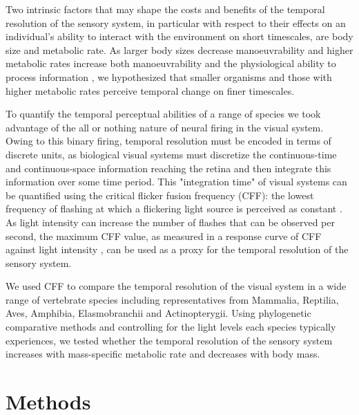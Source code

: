Two intrinsic factors that may shape the costs and benefits of the temporal resolution of the sensory system, in particular with respect to their effects on an individual's ability to interact with the environment on short timescales, are body size and metabolic rate. As larger body sizes decrease manoeuvrability \citep{heglund1988speed,dudley2002mechanisms,biewener2003animal,sato2007stroke,vogel2008modes,hedrick2011damping,watanabe2012slowest} and higher metabolic rates increase both manoeuvrability and the physiological ability to process information \citep{li2008optimal,franz2002temperature}, we hypothesized that smaller organisms and those with higher metabolic rates perceive temporal change on finer timescales.

To quantify the temporal perceptual abilities of a range of species we took advantage of the all or nothing nature of neural firing in the visual system. Owing to this binary firing, temporal resolution must be encoded in terms of discrete units, as biological visual systems must discretize the continuous-time and continuous-space information reaching the retina and then integrate this information over some time period. This "integration time" of visual systems can be quantified using the critical flicker fusion frequency (CFF): the lowest frequency of flashing at which a flickering light source is perceived as constant \citep{d1998can,schwartz2010visual}. As light intensity can increase the number of flashes that can be observed per second, the maximum CFF value, as measured in a response curve of CFF against light intensity \citep{ferry1892persistence,porter1902contributions}, can be used as a proxy for the temporal resolution of the sensory system.

We used CFF to compare the temporal resolution of the visual system in a wide range of vertebrate species including representatives from Mammalia, Reptilia, Aves, Amphibia, Elasmobranchii and Actinopterygii. Using phylogenetic comparative methods and controlling for the light levels each species typically experiences, we tested whether the temporal resolution of the sensory system increases with mass-specific metabolic rate and decreases with body mass.

\section{Methods}
